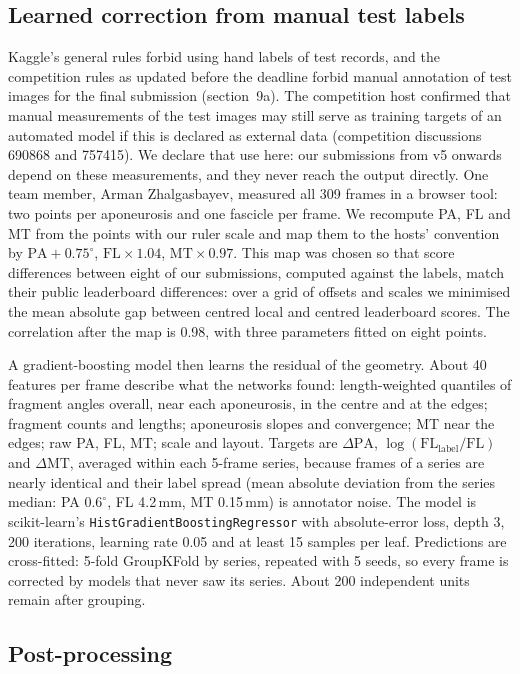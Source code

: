 \documentclass[11pt,a4paper]{article}
\newcommand{\PA}{\mathrm{PA}}
\newcommand{\FL}{\mathrm{FL}}
\newcommand{\MT}{\mathrm{MT}}
\begin{document}
\subsection{Learned correction from manual test labels}
\label{sec:learned}

Kaggle's general rules forbid using hand labels of test records, and the competition rules as updated before the deadline forbid manual annotation of test images for the final submission (section~9a). The competition host confirmed that manual measurements of the test images may still serve as training targets of an automated model if this is declared as external data (competition discussions 690868 and 757415). We declare that use here: our submissions from v5 onwards depend on these measurements, and they never reach the output directly. One team member, Arman Zhalgasbayev, measured all 309 frames in a browser tool: two points per aponeurosis and one fascicle per frame. We recompute PA, FL and MT from the points with our ruler scale and map them to the hosts' convention by $\PA+0.75^\circ$, $\FL\times1.04$, $\MT\times0.97$. This map was chosen so that score differences between eight of our submissions, computed against the labels, match their public leaderboard differences: over a grid of offsets and scales we minimised the mean absolute gap between centred local and centred leaderboard scores. The correlation after the map is 0.98, with three parameters fitted on eight points.

A gradient-boosting model then learns the residual of the geometry. About 40 features per frame describe what the networks found: length-weighted quantiles of fragment angles overall, near each aponeurosis, in the centre and at the edges; fragment counts and lengths; aponeurosis slopes and convergence; MT near the edges; raw PA, FL, MT; scale and layout. Targets are $\Delta\PA$, $\log(\FL_\mathrm{label}/\FL)$ and $\Delta\MT$, averaged within each 5-frame series, because frames of a series are nearly identical and their label spread (mean absolute deviation from the series median: PA $0.6^\circ$, FL 4.2\,mm, MT 0.15\,mm) is annotator noise. The model is scikit-learn's \texttt{HistGradientBoostingRegressor} with absolute-error loss, depth 3, 200 iterations, learning rate 0.05 and at least 15 samples per leaf. Predictions are cross-fitted: 5-fold GroupKFold by series, repeated with 5 seeds, so every frame is corrected by models that never saw its series. About 200 independent units remain after grouping.

\subsection{Post-processing}
\end{document}
